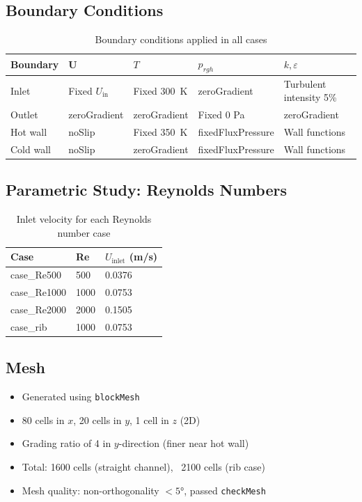 \documentclass[12pt, a4paper]{article}
\begin{document}
\subsection{Boundary Conditions}
\begin{table}[H]
    \centering
    \caption{Boundary conditions applied in all cases}
    \begin{tabular}{lllll}
        \toprule
        Boundary & $\mathbf{U}$ & $T$ & $p_{rgh}$ & $k, \varepsilon$ \\
        \midrule
        Inlet     & Fixed $U_\text{in}$ & Fixed \SI{300}{K} & zeroGradient & Turbulent intensity 5\% \\
        Outlet    & zeroGradient & zeroGradient & Fixed 0 Pa & zeroGradient \\
        Hot wall  & noSlip & Fixed \SI{350}{K} & fixedFluxPressure & Wall functions \\
        Cold wall & noSlip & zeroGradient & fixedFluxPressure & Wall functions \\
        \bottomrule
    \end{tabular}
\end{table}

\subsection{Parametric Study: Reynolds Numbers}
\begin{table}[H]
    \centering
    \caption{Inlet velocity for each Reynolds number case}
    \begin{tabular}{lll}
        \toprule
        Case & Re & $U_\text{inlet}$ (m/s) \\
        \midrule
        case\_Re500  & 500  & 0.0376 \\
        case\_Re1000 & 1000 & 0.0753 \\
        case\_Re2000 & 2000 & 0.1505 \\
        case\_rib    & 1000 & 0.0753 \\
        \bottomrule
    \end{tabular}
\end{table}

\subsection{Mesh}
\begin{itemize}
    \item Generated using \texttt{blockMesh}
    \item 80 cells in $x$, 20 cells in $y$, 1 cell in $z$ (2D)
    \item Grading ratio of 4 in $y$-direction (finer near hot wall)
    \item Total: 1600 cells (straight channel), ~2100 cells (rib case)
    \item Mesh quality: non-orthogonality $< 5°$, passed \texttt{checkMesh}
\end{itemize}
\end{document}
